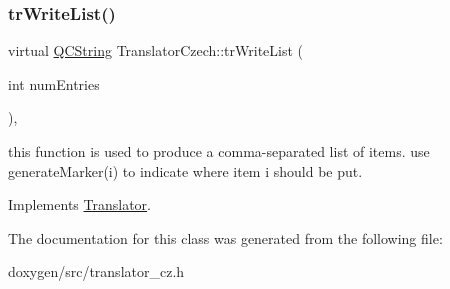 \subsubsection{\texorpdfstring{trWriteList()}{trWriteList()}}
{\footnotesize\ttfamily virtual \mbox{\hyperlink{class_q_c_string}{Q\+C\+String}} Translator\+Czech\+::tr\+Write\+List (\begin{DoxyParamCaption}\item[{int}]{num\+Entries }\end{DoxyParamCaption})\hspace{0.3cm}{\ttfamily [inline]}, {\ttfamily [virtual]}}

this function is used to produce a comma-\/separated list of items. use generate\+Marker(i) to indicate where item i should be put. 

Implements \mbox{\hyperlink{class_translator}{Translator}}.



The documentation for this class was generated from the following file\+:\begin{DoxyCompactItemize}
\item 
doxygen/src/translator\+\_\+cz.\+h\end{DoxyCompactItemize}
